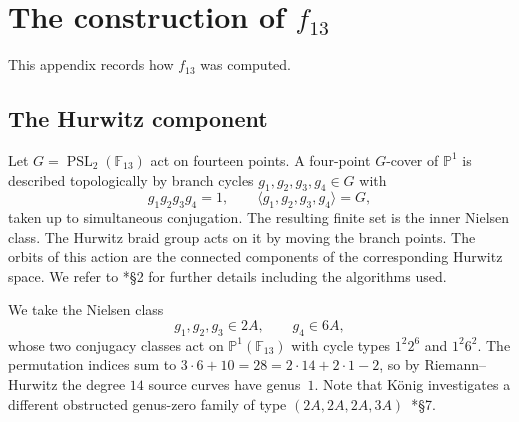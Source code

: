 \documentclass[10pt]{amsart}
\numberwithin{equation}{section}
\theoremstyle{definition}
\theoremstyle{remark}
\newcommand{\PP}{\mathbb P}
\newcommand{\F}{\mathbb{F}}
\newcommand{\PSL}{\operatorname{PSL}}
\begin{document}
\appendix

\section{The construction of \texorpdfstring{$f_{13}$}{f13}}
\label{app:f13-construction}
This appendix records how $f_{13}$ was computed. 

\subsection{The Hurwitz component}
Let $G=\PSL_2(\F_{13})$ act on fourteen points.  A four-point $G$-cover of
$\PP^1$ is described topologically by branch cycles $g_1,g_2,g_3,g_4\in G$
with
\[
 g_1g_2g_3g_4=1,\qquad\langle g_1,g_2,g_3,g_4\rangle=G ,
\]
taken up to simultaneous conjugation. The resulting finite set is the inner
Nielsen class. The Hurwitz braid group acts on it by moving the branch
points. The orbits of this action are the connected components of the corresponding
Hurwitz space.  We refer to \cite{Koenig2017}*{\S2} for further details including the algorithms used.

We take the Nielsen class
\begin{equation}\label{eq:l13-nielsen}
 g_1,g_2,g_3\in2A,\qquad g_4\in6A ,
\end{equation}
whose two conjugacy classes act on $\PP^1(\F_{13})$ with cycle types $1^2 2^6$ and
$1^2 6^2$.  The permutation indices sum to
$3\cdot6+10=28=2\cdot14+2\cdot1-2$, so by Riemann--Hurwitz the degree $14$
source curves have genus~$1$. Note that K\"onig investigates a different obstructed genus-zero
family of type $(2A,2A,2A,3A)$~\cite{Koenig2017}*{\S7}. 
\end{document}
